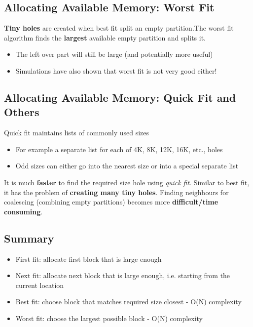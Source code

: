 \documentclass{article}
\begin{document}
\subsection{Allocating Available Memory: Worst Fit}
\begin{flushleft}
\textbf{Tiny holes} are created when best fit split an empty partition.The worst fit algorithm finds the \textbf{largest} available empty partition and splits it.
\begin{itemize}
	\item The left over part will still be large (and potentially more useful)
	\item Simulations have also shown that worst fit is not very good either!
\end{itemize}
\end{flushleft}

\subsection{Allocating Available Memory: Quick Fit and Others}
\begin{flushleft}
Quick fit maintains lists of commonly used sizes
\begin{itemize}
	\item For example a separate list for each of 4K, 8K, 12K, 16K, etc., holes
	\item Odd sizes can either go into the nearest size or into a special separate list 
\end{itemize}
It is much \textbf{faster} to find the required size hole using \textit{quick fit}. Similar to best fit, it has the problem of \textbf{creating many tiny holes}. Finding neighbours for coalescing (combining empty partitions) becomes more \textbf{difficult/time consuming}.
\end{flushleft}

\subsection{Summary}
\begin{itemize}
	\item First fit: allocate first block that is large enough
	\item Next fit: allocate next block that is large enough, i.e. starting from the current location
	\item Best fit: choose block that matches required size closest - O(N) complexity
	\item Worst fit: choose the largest possible block - O(N) complexity
\end{itemize}
\end{document}
